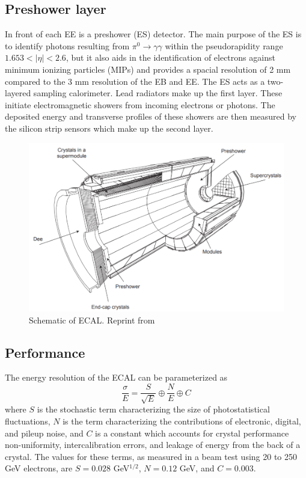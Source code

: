 \subsection{Preshower layer}
In front of each EE is a preshower (ES) detector.  The main purpose of the ES is to identify photons resulting from $\pi^{0}\rightarrow \gamma \gamma$ within the pseudorapidity range $1.653 < |\eta| < 2.6$, but it also aids in the identification of electrons against minimum ionizing particles (MIPs) and provides a spacial resolution of 2 mm compared to the 3 mm resolution of the EB and EE.  The ES acts as a two-layered sampling calorimeter.  Lead radiators make up the first layer.   These initiate electromagnetic showers from incoming electrons or photons.  The deposited energy and transverse profiles of these showers are then measured by the silicon strip sensors which make up the second layer.  

\begin{figure}[h]
	\centering
	\includegraphics[width=0.7\linewidth]{Figures/ECAL_layout}
	\caption{Schematic of ECAL. Reprint from \cite{Collaboration_2008}}
	\label{fig:ecallayout}
\end{figure}

\subsection{Performance}
The energy resolution of the ECAL can be parameterized as 
\begin{equation}
\frac{\sigma}{E} = \frac{S}{\sqrt{E}} \oplus \frac{N}{E} \oplus C
\end{equation}
where $S$ is the stochastic term characterizing the size of photostatistical fluctuations, $N$ is the term characterizing the contributions of electronic, digital, and pileup noise, and $C$ is a constant which accounts for crystal performance non-uniformity, intercalibration errors, and leakage of energy from the back of a crystal.  The values for these terms, as measured in a beam test using 20 to 250 GeV electrons, are $S=0.028$ GeV$^{1/2}$, $N=0.12$ GeV, and $C=0.003$.  \cite{Collaboration_2008}


